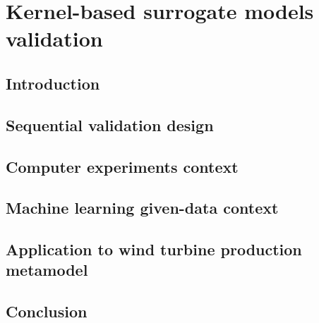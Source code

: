\chapter{Kernel-based surrogate models validation}
\hfill
\localtableofcontents
\newpage

\section{Introduction}
\section{Sequential validation design}
\section{Computer experiments context}
\section{Machine learning given-data context}
\section{Application to wind turbine production metamodel}
\section{Conclusion}